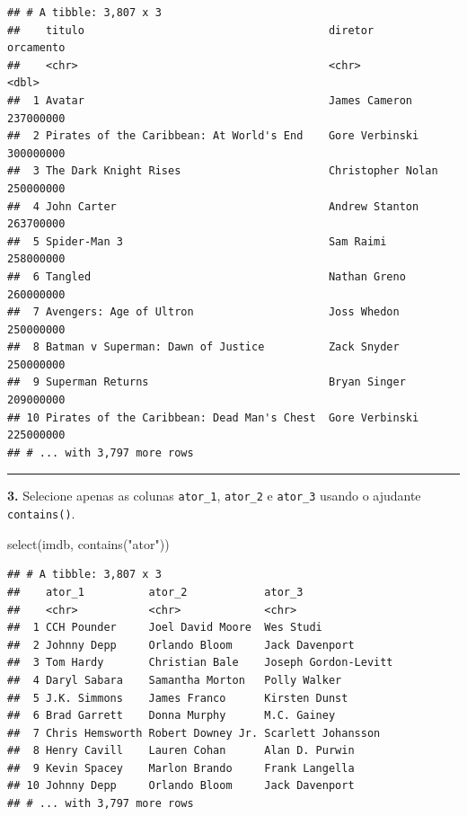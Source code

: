 \documentclass[
]{book}
\newenvironment{Shaded}{\begin{snugshade}}{\end{snugshade}}
\newcommand{\FunctionTok}[1]{\textcolor[rgb]{0.00,0.00,0.00}{#1}}
\newcommand{\NormalTok}[1]{#1}
\newcommand{\StringTok}[1]{\textcolor[rgb]{0.31,0.60,0.02}{#1}}
\begin{document}
\begin{verbatim}
## # A tibble: 3,807 x 3
##    titulo                                      diretor           orcamento
##    <chr>                                       <chr>                 <dbl>
##  1 Avatar                                      James Cameron     237000000
##  2 Pirates of the Caribbean: At World's End    Gore Verbinski    300000000
##  3 The Dark Knight Rises                       Christopher Nolan 250000000
##  4 John Carter                                 Andrew Stanton    263700000
##  5 Spider-Man 3                                Sam Raimi         258000000
##  6 Tangled                                     Nathan Greno      260000000
##  7 Avengers: Age of Ultron                     Joss Whedon       250000000
##  8 Batman v Superman: Dawn of Justice          Zack Snyder       250000000
##  9 Superman Returns                            Bryan Singer      209000000
## 10 Pirates of the Caribbean: Dead Man's Chest  Gore Verbinski    225000000
## # ... with 3,797 more rows
\end{verbatim}

\begin{center}\rule{0.5\linewidth}{0.5pt}\end{center}

\textbf{3.} Selecione apenas as colunas \texttt{ator\_1}, \texttt{ator\_2} e \texttt{ator\_3} usando o ajudante \texttt{contains()}.

\begin{Shaded}
\begin{Highlighting}[]
\FunctionTok{select}\NormalTok{(imdb, }\FunctionTok{contains}\NormalTok{(}\StringTok{"ator"}\NormalTok{))}
\end{Highlighting}
\end{Shaded}

\begin{verbatim}
## # A tibble: 3,807 x 3
##    ator_1          ator_2            ator_3              
##    <chr>           <chr>             <chr>               
##  1 CCH Pounder     Joel David Moore  Wes Studi           
##  2 Johnny Depp     Orlando Bloom     Jack Davenport      
##  3 Tom Hardy       Christian Bale    Joseph Gordon-Levitt
##  4 Daryl Sabara    Samantha Morton   Polly Walker        
##  5 J.K. Simmons    James Franco      Kirsten Dunst       
##  6 Brad Garrett    Donna Murphy      M.C. Gainey         
##  7 Chris Hemsworth Robert Downey Jr. Scarlett Johansson  
##  8 Henry Cavill    Lauren Cohan      Alan D. Purwin      
##  9 Kevin Spacey    Marlon Brando     Frank Langella      
## 10 Johnny Depp     Orlando Bloom     Jack Davenport      
## # ... with 3,797 more rows
\end{verbatim}
\end{document}
